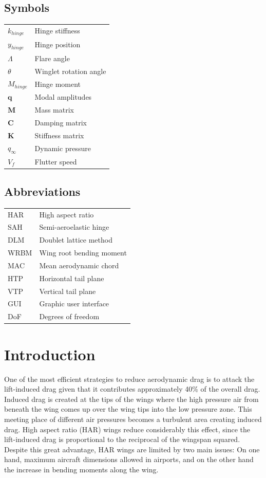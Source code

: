 \documentclass[conference]{IEEEtran}
\begin{document}
\subsection*{Symbols}
\begin{tabular}{l l}
$k_{hinge}$&    Hinge stiffness\\
$y_{hinge}$&    Hinge position\\
$\Lambda$&      Flare angle\\
$\theta$ &      Winglet rotation angle\\
$M_{hinge}$&    Hinge moment\\
$\textbf{q}$&   Modal amplitudes\\
$\textbf{M}$&   Mass matrix\\
$\textbf{C}$&   Damping matrix\\
$\textbf{K}$&   Stiffness matrix\\
$q_{\infty}$&   Dynamic pressure\\
$V_f$&          Flutter speed\\
\end{tabular}

\subsection*{Abbreviations}

\begin{tabular}{l l}
HAR&    High aspect ratio\\
SAH&    Semi-aeroelastic hinge\\
DLM&    Doublet lattice method\\
WRBM&   Wing root bending moment\\
MAC&    Mean aerodynamic chord\\
HTP&    Horizontal tail plane\\
VTP&    Vertical tail plane\\
GUI&    Graphic user interface\\
DoF&    Degrees of freedom\\
\end{tabular}



\section{Introduction}
\label{sec:problem-statement}

One of the most efficient strategies to reduce aerodynamic drag is to attack the lift-induced drag given that it contributes approximately 40\% of the overall drag. Induced drag is created at the tips of the wings where the high pressure air from beneath the wing comes up over the wing tips into the low pressure zone. This meeting place of different air pressures becomes a turbulent area creating induced drag. High aspect ratio (HAR) wings reduce considerably this effect, since the lift-induced drag is proportional to the reciprocal of the wingspan squared. Despite this great advantage, HAR wings are limited by two main issues: On one hand, maximum aircraft dimensions allowed in airports, and on the other hand the increase in bending moments along the wing.
\end{document}
